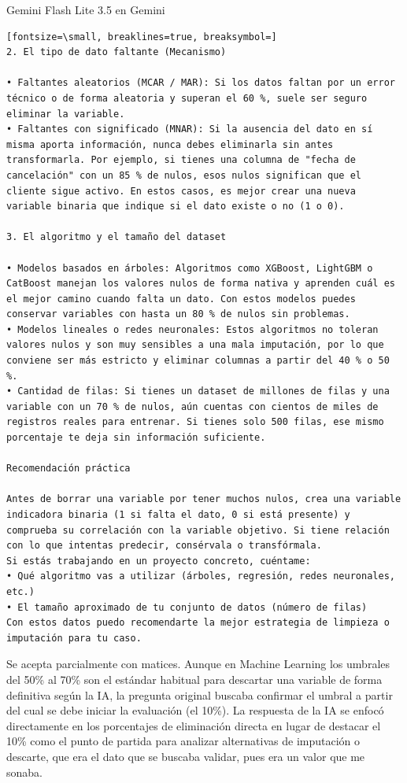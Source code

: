 \documentclass[12pt,a4paper,oneside]{book}
\begin{document}
\begin{iaprompt}
\begin{iaresp}{Gemini Flash Lite 3.5 en Gemini}
\begin{Verbatim}[fontsize=\small, breaklines=true, breaksymbol=]
2. El tipo de dato faltante (Mecanismo)

• Faltantes aleatorios (MCAR / MAR): Si los datos faltan por un error técnico o de forma aleatoria y superan el 60 %, suele ser seguro eliminar la variable.
• Faltantes con significado (MNAR): Si la ausencia del dato en sí misma aporta información, nunca debes eliminarla sin antes transformarla. Por ejemplo, si tienes una columna de "fecha de cancelación" con un 85 % de nulos, esos nulos significan que el cliente sigue activo. En estos casos, es mejor crear una nueva variable binaria que indique si el dato existe o no (1 o 0).

3. El algoritmo y el tamaño del dataset

• Modelos basados en árboles: Algoritmos como XGBoost, LightGBM o CatBoost manejan los valores nulos de forma nativa y aprenden cuál es el mejor camino cuando falta un dato. Con estos modelos puedes conservar variables con hasta un 80 % de nulos sin problemas.
• Modelos lineales o redes neuronales: Estos algoritmos no toleran valores nulos y son muy sensibles a una mala imputación, por lo que conviene ser más estricto y eliminar columnas a partir del 40 % o 50 %.
• Cantidad de filas: Si tienes un dataset de millones de filas y una variable con un 70 % de nulos, aún cuentas con cientos de miles de registros reales para entrenar. Si tienes solo 500 filas, ese mismo porcentaje te deja sin información suficiente.

Recomendación práctica

Antes de borrar una variable por tener muchos nulos, crea una variable indicadora binaria (1 si falta el dato, 0 si está presente) y comprueba su correlación con la variable objetivo. Si tiene relación con lo que intentas predecir, consérvala o transfórmala.
Si estás trabajando en un proyecto concreto, cuéntame:
• Qué algoritmo vas a utilizar (árboles, regresión, redes neuronales, etc.)
• El tamaño aproximado de tu conjunto de datos (número de filas)
Con estos datos puedo recomendarte la mejor estrategia de limpieza o imputación para tu caso.
\end{Verbatim}
\end{iaresp}
\begin{iaanalisis}
Se acepta parcialmente con matices. Aunque en Machine Learning los umbrales del 50\% al 70\% son el estándar habitual para descartar una variable de forma definitiva según la IA, la pregunta original buscaba confirmar el umbral a partir del cual se debe iniciar la evaluación (el 10\%). La respuesta de la IA se enfocó directamente en los porcentajes de eliminación directa en lugar de destacar el 10\% como el punto de partida para analizar alternativas de imputación o descarte, que era el dato que se buscaba validar, pues era un valor que me sonaba.
\end{iaanalisis}




\end{iaprompt}
\end{document}
